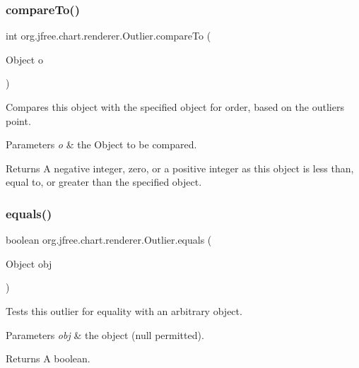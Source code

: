 \subsubsection{\texorpdfstring{compare\+To()}{compareTo()}}
{\footnotesize\ttfamily int org.\+jfree.\+chart.\+renderer.\+Outlier.\+compare\+To (\begin{DoxyParamCaption}\item[{Object}]{o }\end{DoxyParamCaption})}

Compares this object with the specified object for order, based on the outlier\textquotesingle{}s point.


\begin{DoxyParams}{Parameters}
{\em o} & the Object to be compared. \\
\hline
\end{DoxyParams}
\begin{DoxyReturn}{Returns}
A negative integer, zero, or a positive integer as this object is less than, equal to, or greater than the specified object. 
\end{DoxyReturn}
\mbox{\label{classorg_1_1jfree_1_1chart_1_1renderer_1_1_outlier_af113d6363655f14b09e01ff7e9abbcdc}} 
\subsubsection{\texorpdfstring{equals()}{equals()}}
{\footnotesize\ttfamily boolean org.\+jfree.\+chart.\+renderer.\+Outlier.\+equals (\begin{DoxyParamCaption}\item[{Object}]{obj }\end{DoxyParamCaption})}

Tests this outlier for equality with an arbitrary object.


\begin{DoxyParams}{Parameters}
{\em obj} & the object ({\ttfamily null} permitted).\\
\hline
\end{DoxyParams}
\begin{DoxyReturn}{Returns}
A boolean. 
\end{DoxyReturn}
\mbox{\label{classorg_1_1jfree_1_1chart_1_1renderer_1_1_outlier_a39bcfa171a0ce35407048df984dd54f4}} 
